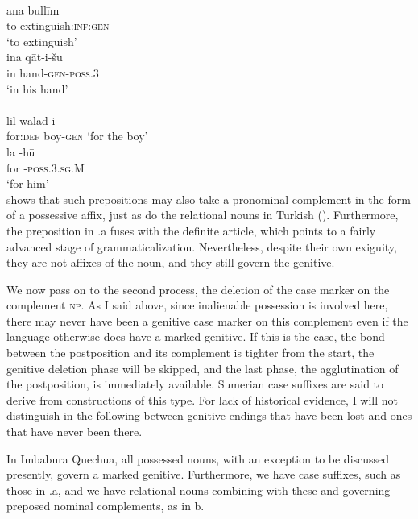 \ea\label{ex:E54}
\langinfo{\LangAccad}{}{}\\
 \ea
 \gll  ana  bull\=im  \\
   to  extinguish:\textsc{inf}:\textsc{gen}  \\
\glt  ‘to extinguish’\\
\ex
\gll  ina  q\=at-i-šu  \\
 in  hand-\textsc{gen}-\textsc{poss}.3 \\
 \glt ‘in his hand’\\
\z
\z
\noindent \ea\label{ex:E55}
\\
 \ea
 \gll lil  walad-i  \\
   for:\textsc{def}  boy-\textsc{gen}  ‘for the boy’\\
\ex
\gll  la  {}-h\=u  \\
 for  {}-\textsc{poss}.3.\textsc{sg}.M \\
 \glt ‘for him’\\
\z
\z
\noindent {} shows that such prepositions may also take a pronominal complement in the form of a possessive affix, just as do the relational nouns in Turkish (). Furthermore, the preposition in .a fuses with the definite article, which points to a fairly advanced stage of grammaticalization. Nevertheless, despite their own exiguity, they are not affixes of the noun, and they still govern the genitive.

We now pass on to the second process, the deletion of the case marker on the complement \textsc{np}. As I said above, since inalienable possession is involved here, there may never have been a genitive case marker on this complement even if the language otherwise does have a marked genitive. If this is the case, the bond between the postposition and its complement is tighter from the start, the genitive deletion phase will be skipped, and the last phase, the agglutination of the postposition, is immediately available. Sumerian case suffixes are said to derive from constructions of this type. For lack of historical evidence, I will not distinguish in the following between genitive endings that have been lost and ones that have never been there.

\label{page87}In Imbabura Quechua, all possessed nouns, with an exception to be discussed presently, govern a marked genitive. Furthermore, we have case suffixes, such as those in .a, and we have relational nouns combining with these and governing preposed nominal complements, as in b.

